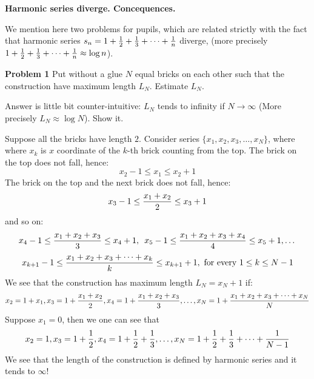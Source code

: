 \def\vare {\varepsilon}
\def\A {{\bf A}}
\def\t {\tilde}
\def\a {\alpha}
\def\K {{\bf K}}
\def\N {{\bf N}}
\def\V {{\cal V}}
\def\s {{\sigma}}
\def\S {{\Sigma}}
\def\s {{\sigma}}
\def\p{\partial}
\def\vare{{\varepsilon}}
\def\Q {{\bf Q}}
\def\D {{\cal D}}
\def\G {{\Gamma}}
\def\C {{\bf C}}
\def\M {{\cal M}}
\def\Z {{\bf Z}}
\def\U  {{\cal U}}
\def\H {{\cal H}}
\def\R  {{\bf R}}
\def\S  {{\bf S}}
\def\E  {{\bf E}}
\def\l {\lambda}
\def\degree {{\bf {\rm degree}\,\,}}
\def \finish {${\,\,\vrule height1mm depth2mm width 8pt}$}
\def \m {\medskip}
\def\p {\partial}
\def\r {{\bf r}}
\def\v {{\bf v}}
\def\n {{\bf n}}
\def\t {{\bf t}}
\def\b {{\bf b}}
\def\c {{\bf c }}
\def\e{{\bf e}}
\def\ac {{\bf a}}
\def \X   {{\bf X}}
\def \Y   {{\bf Y}}
\def \x   {{\bf x}}
\def \y   {{\bf y}}
\def \G{{\cal G}}


\centerline{\bf Harmonic series diverge. Concequences.}


We mention here two problems for pupils, which are related
strictly with the fact that harmonic series $s_n=1+{1\over
2}+{1\over 3}+\dots+{1\over n}$ diverge, (more precisely
$1+{1\over 2}+{1\over 3}+\dots+{1\over n}\approx \log n $).




{\bf Problem 1} Put without a glue $N$ equal bricks on each other
 such that the construction have maximum length  $L_N$.  Estimate
 $L_N$.

  Answer is little bit counter-intuitive:
  $L_N$ tends to infinity if $N\to \infty$ (More precisely $L_N\approx \log N$). Show it.


  \medskip

 Suppose all the bricks have length $2$.
 Consider series $\{x_1,x_2,x_3,\dots,x_N\}$, where
where $x_k$ is $x$ coordinate of the $k$-th brick counting from
the top.  The brick on the top does not fall, hence:
                  $$
              x_2-1\leq x_1\leq x_2+1
                   $$
The brick on the top and the next brick does not fall, hence:
             $$
             x_3-1\leq {x_1+x_2\over 2}\leq x_3+1
             $$
and so on:
             $$
       x_4-1\leq {x_1+x_2+x_3\over 3}\leq x_4+1,\,\,\,x_5-1\leq {x_1+x_2+x_3+x_4\over 4}\leq
       x_5+1,\dots
             $$
            $$
x_{k+1}-1\leq {x_1+x_2+x_3+\dots+x_k\over k}\leq
x_{k+1}+1,\,\,\hbox{for every $1\leq k\leq N-1$}
            $$
We see that the construction has maximum length $L_N=x_N+1$ if:
                $$
x_2=1+x_1, x_3=1+{x_1+x_2\over 2},x_4=1+{x_1+x_2+x_3\over
3},\dots, x_{N}=1+{x_1+x_2+x_3+\dots+x_N\over N}
                $$
Suppose $x_1=0$, then we one can see that
           $$
  x_2=1,x_3=1+{1\over 2},x_4=1+{1\over 2}+{1\over 3},\dots,
  x_N=1+{1\over 2}+{1\over 3}+\dots+{1\over
              N-1}
           $$
We see that the length of the construction is defined by harmonic series and it tends to $\infty$!

